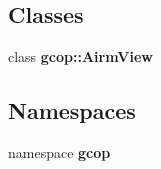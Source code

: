 \subsection*{\-Classes}
\begin{DoxyCompactItemize}
\item 
class {\bf gcop\-::\-Airm\-View}
\end{DoxyCompactItemize}
\subsection*{\-Namespaces}
\begin{DoxyCompactItemize}
\item 
namespace {\bf gcop}
\end{DoxyCompactItemize}
